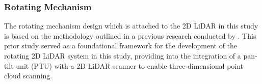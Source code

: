 




\subsubsection{Rotating Mechanism}

The rotating mechanism design which is attached to the 2D LiDAR in this study is based on the methodology outlined in a previous research conducted by \citet{clar2022}. This prior study served as a foundational framework for the development of the rotating 2D LiDAR system in this study, providing into the integration of a pan-tilt unit (PTU) with a 2D LiDAR scanner to enable three-dimensional point cloud scanning.

